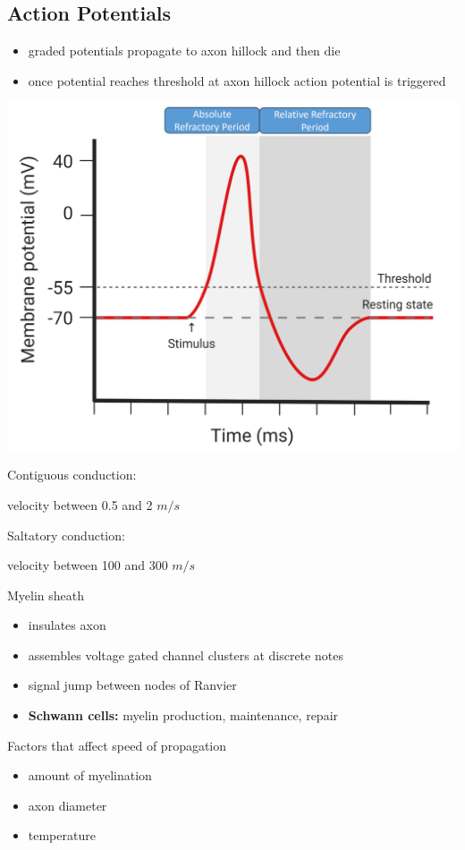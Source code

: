 \documentclass[11pt,fleqn]{book} %
\begin{document}
\subsection{Action Potentials}
\begin{itemize}
    \item graded potentials propagate to axon hillock and then die
    \item once potential reaches threshold at axon hillock action potential is triggered
\end{itemize}
\begin{center}
    \includegraphics[width=0.65\linewidth]{Pictures/Screenshot 2024-02-26 003521.png}
\end{center}
\begin{descriptions}
    \item[Contiguous conduction:] 
    \begin{descriptions}
    \end{descriptions}    
    velocity between 0.5 and 2 $m/s$
    \item[Saltatory conduction:] 
    \begin{descriptions}
    \end{descriptions}    
    velocity between 100 and 300 $m/s$ 
    \item[Myelin sheath]\begin{descriptions}
    \end{descriptions} 
    \begin{itemize}
        \item insulates axon
        \item assembles voltage gated channel clusters at discrete notes
        \item signal jump between nodes of Ranvier
        \item \textbf{Schwann cells:} myelin production, maintenance, repair
    \end{itemize}
    \item[Factors that affect speed of propagation]\begin{descriptions}
    \end{descriptions} 
    \begin{itemize}
        \item amount of myelination
        \item axon diameter
        \item temperature
    \end{itemize}
\end{descriptions}
\end{document}
